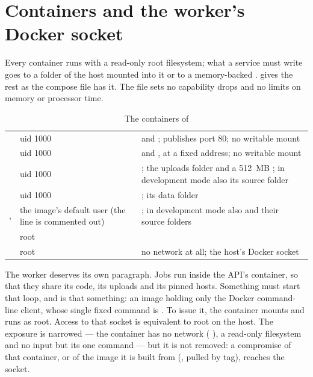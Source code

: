 \section{Containers and the worker's Docker socket}\label{sec:security:containers}

Every container runs with a read-only root filesystem; what a service must write goes to a
folder of the host mounted into it or to a memory-backed .  gives the
rest as the compose file has it. The file sets no capability drops and no limits on memory
or processor time.

\begin{table}[H]
\caption{The containers of }\label{tab:security:containers}
\begin{tabularx}{\textwidth}{@{}L{38mm}L{27mm}Y@{}}
\toprule
{} &  &  \\
\midrule
{} & uid 1000 &  and ; publishes port 80; no writable mount \\
 & uid 1000 &  and , at a fixed address; no writable mount \\
 & uid 1000 & ; the uploads folder and a 512~MB ; in development mode also its source folder \\
 & uid 1000 & ; its data folder \\
,  & the image's default user (the  line is commented out) & ; in development mode also  and their source folders \\
 & root &  \\
 & root & no network at all; the host's Docker socket \\
\bottomrule
\end{tabularx}
\end{table}

The worker deserves its own paragraph. Jobs run inside the API's container, so that they
share its code, its uploads and its pinned hosts. Something must start that loop, and
 is that something: an image holding only the Docker command-line
client, whose single fixed command is      . To issue it, the container mounts  and runs as root.
Access to that socket is equivalent to root on the host. The exposure is narrowed --- the
container has no network ( ), a read-only filesystem and no input but
its one command --- but it is not removed: a compromise of that container, or of the image it
is built from (, pulled by tag), reaches the socket.

